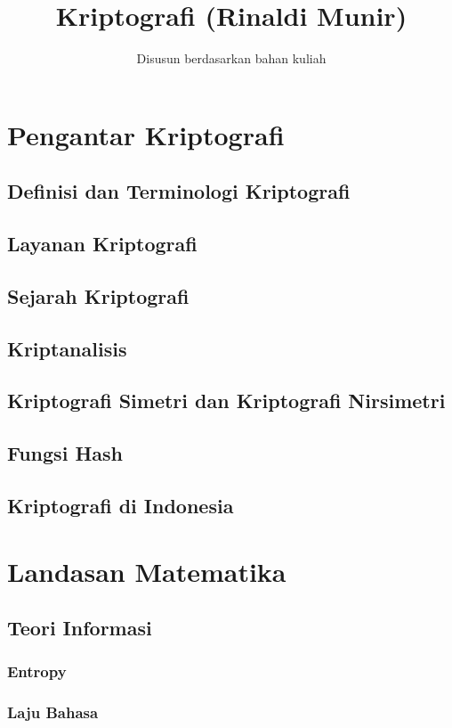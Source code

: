 \documentclass{book}
\title{Kriptografi (Rinaldi Munir)}
\author{Disusun berdasarkan bahan kuliah}
\date{}
\begin{document}
\maketitle

\tableofcontents

\chapter{Pengantar Kriptografi}
    \section{Definisi dan Terminologi Kriptografi}
    \section{Layanan Kriptografi}
    \section{Sejarah Kriptografi}
    \section{Kriptanalisis}
    \section{Kriptografi Simetri dan Kriptografi Nirsimetri}
    \section{Fungsi Hash}
    \section{Kriptografi di Indonesia}
\chapter{Landasan Matematika}
    \section{Teori Informasi}
        \subsection{Entropy}
        \subsection{Laju Bahasa}
\end{document}
